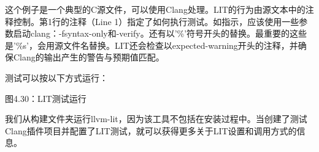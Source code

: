 这个例子是一个典型的C源文件，可以使用Clang处理。LIT的行为由源文本中的注释控制。第1行的注释（Line 1）指定了如何执行测试。如指示，应该使用一些参数启动clang：-fsyntax-only和-verify。还有以'\%'符号开头的替换。最重要的这些是'\%s'，会用源文件名替换。LIT还会检查以expected-warning开头的注释，并确保Clang的输出产生的警告与预期值匹配。

测试可以按以下方式运行：


\begin{center}
图4.30：LIT测试运行
\end{center}

我们从构建文件夹运行llvm-lit，因为该工具不包括在安装过程中。当创建了测试Clang插件项目并配置了LIT测试，就可以获得更多关于LIT设置和调用方式的信息。
















